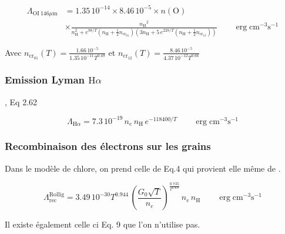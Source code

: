 \begin{equation}
\begin{split}
    \Lambda_{\mathrm{OI}\ 146 \mu \mathrm{m}} &= 1.35\,10^{-14} \times 8.46\,10^{-5} \times 
    n(\mathrm{O}) \\
    & \times \frac{ {n_\mathrm{H}}^2 }{n_\mathrm{H}^2+ e^{98/T}(n_\mathrm{H} + \frac{1}{2} n_{\mathrm{cr}_{01}} ) (3 n_\mathrm{H} + 5\, e^{228/T} (n_\mathrm{H} + \frac{1}{2} n_{\mathrm{cr}_{12}} )) } \qquad \operatorname{erg} \mathrm{cm}^{-3} \mathrm{s}^{-1}
\end{split}
\end{equation}

Avec $n_{\mathrm{cr}_{01}}(T) = \frac{1.66\,10^{-5} }{1.35\,10^{-11} T^{0.49}} $ et $n_{\mathrm{cr}_{12}}(T) = \frac{8.46\,10^{-5} }{4.37\,10^{-12} T^{0.66}} $


\subsubsection{Emission Lyman $\mathrm{H}\alpha$}

\cite{tielens2005}, Eq 2.62

\begin{equation}
    \Lambda_{\mathrm{H}\alpha} = 7.3\, 10^{-19}\,n_e\,n_\mathrm{H}\,e^{-118400/T} \qquad \operatorname{erg} \mathrm{cm}^{-3} \mathrm{s}^{-1}
\end{equation}


\subsubsection{Recombinaison des électrons sur les grains}

Dans le modèle de chlore, on prend celle de \cite{Rollig2005} Eq.4  qui provient elle même de \cite{BakesTielens1994}.

\begin{equation}
    \Lambda_{\mathrm{rec}}^{\mathrm{Rollïg}} = 3.49\,10^{-30} T^{0.944} \, (\frac{G_0 \sqrt{T}}{n_e})^{\frac{0.735}{T^{0.068}}} \, n_e \, n_\mathrm{H} \qquad \operatorname{erg} \mathrm{cm}^{-3} \mathrm{s}^{-1}
    \label{eq:Rollig:rece}
\end{equation}

Il existe également celle ci \cite{WolfireHollenbachMcKeeTielensBakes_1995} Eq. 9 que l'on n'utilise pas.

